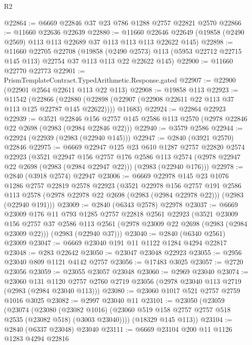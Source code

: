 \begin{lexlean}{R2}
\begin{coremodule}
@22864 := @6669 @22846 @37 @23 @786 @1288 @2757 @22821 @2570
@22866 := @11660 @22636 @22639
@22880 := @11660
    @22646
    @22649
    (@19858 (@2490 @2569) @113 @113 @22689 @37 @113 @113 @113 @22622 @145)
@22898 := @11660
    @22705
    @22708
    (@19858 (@2490 @2573) @113 (@5953 @22712 @22715 @145 @113) @22754 @37 @113 @113 @22 @22622 @145)
@22900 := @11660 @22770 @22773
@22901 := PrismTemplateContract.TypedArithmetic.Response.gated
@22907 := @22900 (@22901 @2564 @22611 @113 @22 @113)
@22908 := @19858 @113
@22923 := @11542
    (@22866
      (@22880 (@22898 (@22907 (@22908 @22611 @22 @113 @37 @113 @125 @22787 @145 @22622))))
      @11683)
@22924 := @22864 @22923
@22939 := @3521
    @22846
    @156
    @2757
    @145
    @2586
    @113
    @2570
    (@2978 @22846 @22 @2698 (@2983 (@2984 @22846 @22)))
@22940 := @3579 @2586
@22944 := @22924 (@22939 (@2983 (@22940 @145)))
@22947 := @2840 (@3921 @2570) @22846
@22975 := @6669
    @22947
    @125
    @23
    @610
    @1287
    @2757
    @22820
    @2574
    @22923
    (@3521
      @22947
      @156
      @2757
      @176
      @2586
      @113
      @2574
      (@2978 @22947 @22 @2698 (@2983 (@2984 @22947 @22)))
      (@2983 (@22940 @176)))
@22978 := @2840 (@3918 @2574) @22947
@23006 := @6669
    @22978
    @145
    @23
    @1076
    @1286
    @2757
    @22819
    @2578
    @22923
    (@3521
      @22978
      @156
      @2757
      @191
      @2586
      @113
      @2578
      (@2978 @22978 @22 @2698 (@2983 (@2984 @22978 @22)))
      (@2983 (@22940 @191)))
@23009 := @2840 (@6343 @2578) @22978
@23037 := @6669
    @23009
    @176
    @11
    @793
    @1285
    @2757
    @22818
    @2561
    @22923
    (@3521
      @23009
      @156
      @2757
      @37
      @2586
      @113
      @2561
      (@2978 @23009 @22 @2698 (@2983 (@2984 @23009 @22)))
      (@2983 (@22940 @37)))
@23040 := @2840 (@6340 @2561) @23009
@23047 := @6669 @23040 @191 @11 @1122 @1284 @4294 @22817
@23048 := @283 @22642
@23050 := @23047 @23048 @22923
@23055 := @2956 @23040 @809 @1121 @4142 @2757
@23056 := @17483 @3025
@23057 := @2720 @23056
@23059 := @23055 @23057 @23048
@23060 := @2969 @23040
@23074 := @23060
    @131
    @1120
    @2757
    @2760
    @2719
    @23056
    (@2978 @23040 @113 @2719 (@2983 (@2984 @23040 @113)))
@23080 := @23060 @1017 @521 @2757 @2759 @1016 @3025
@23082 := @2997 @23040 @11
@23101 := @23050
    (@23059
      (@23074
        (@23080
          (@23082 @1016)
          (@23060 @519 @158 @2757 @2757 @518 @2535 (@23082 @518) (@3003 @23040))))
      (@18329 @145 @113))
@23104 := @2840 (@6337 @23048) @23040
@23111 := @6669 @23104 @200 @11 @1126 @1283 @4294 @22816

\end{coremodule}
\end{lexlean}
